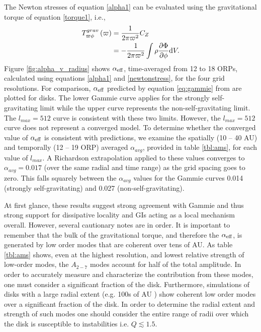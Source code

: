 \documentclass[manuscript]{aastex}
\begin{document}
The Newton stresses of equation \eqref{alpha1} can be evaluated using the gravitational torque of equation \eqref{torque1}, i.e.,
\begin{equation}
\label{newtonstress}
\begin{split}
 T_{\varpi\phi}^{grav}\left( \varpi \right) & = \frac{1}{2\pi\varpi^2}C_Z\\
                                & = - \frac{1}{2\pi\varpi^2} \int \rho\frac{\partial\Phi}{\partial\phi} {\rm d}V.
\end{split}
\end{equation}
Figure \ref{fig:alpha_v_radius} shows $\alpha_{\rm{eff}}$, time-averaged from 12 to 18 ORPs, calculated using equations \eqref{alpha1} and \eqref{newtonstress},
for the four grid resolutions.  For comparison, 
$\alpha_{\rm{eff}}$ predicted by equation \eqref{eq:gammie} from \citet{gammie2001} are plotted for disks.  The lower  Gammie curve applies for the strongly self-gravitating limit while the upper curve 
represents the non-self-gravitating limit.   The $l_{max} = 512$ curve is consistent with these two limits.  However, 
the  $l_{max} = 512$ curve does not represent a converged model.
To determine whether the converged value of $\alpha_{\rm{eff}}$ is consistent with predictions, we examine 
the spatially (10 -- 40 AU) and temporally (12 -- 19 ORP) averaged  $\alpha_{avg}$,
provided in table \ref{tbl:ams}, for each value of  $l_{max}$.    A Richardson extrapolation applied to these values  
converges to $\alpha_{avg} = 0.017$ (over the same radial  and time range)
as the grid spacing goes to zero.   This falls squarely
between the $\alpha_{avg}$ values for the Gammie curves 0.014 (strongly self-gravitating) and 0.027 (non-self-gravitating).

At first glance, these results suggest strong agreement with Gammie and thus strong support for dissipative
locality and GIs acting as a local mechanism overall.  However, several cautionary notes are in order. It is important to remember that the bulk of the gravitational torque, and therefore the $\alpha_{\rm{eff}}$, is generated by low order modes that are coherent over tens of AU. As table \ref{tbl:ams} shows, even at the highest resolution, and lowest relative strength of low-order modes, the $A_{2-7}$ modes account for half of the total amplitude. In order to accurately measure and characterize the contribution from these modes, one must consider a significant fraction of the disk. Furthermore, simulations of disks with a large radial extent (e.g. 100s of AU \citep{boley2009}) show coherent low order modes over a significant fraction of the disk. In order to determine the radial extent and strength of such modes one should consider the entire range of radii over which the disk is susceptible to instabilities i.e. $Q \lesssim 1.5$.  
\end{document}
